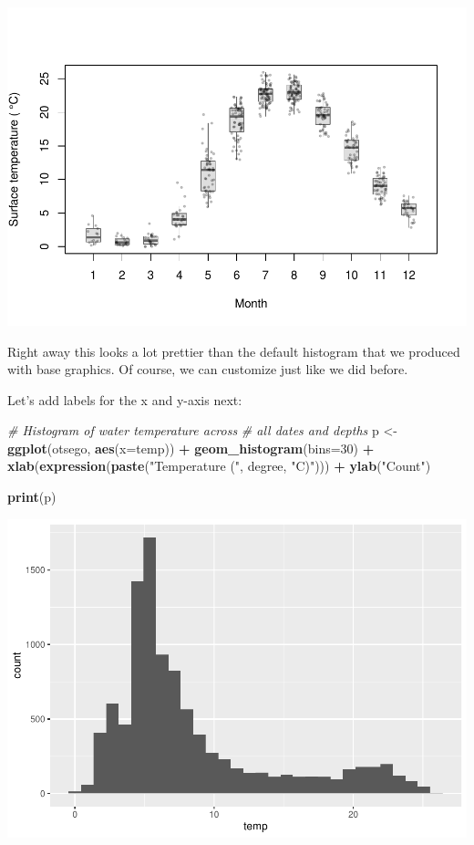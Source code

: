\documentclass[
]{book}
\newenvironment{Shaded}{\begin{snugshade}}{\end{snugshade}}
\newcommand{\CommentTok}[1]{\textcolor[rgb]{0.56,0.35,0.01}{\textit{#1}}}
\newcommand{\DataTypeTok}[1]{\textcolor[rgb]{0.13,0.29,0.53}{#1}}
\newcommand{\DecValTok}[1]{\textcolor[rgb]{0.00,0.00,0.81}{#1}}
\newcommand{\KeywordTok}[1]{\textcolor[rgb]{0.13,0.29,0.53}{\textbf{#1}}}
\newcommand{\NormalTok}[1]{#1}
\newcommand{\OperatorTok}[1]{\textcolor[rgb]{0.81,0.36,0.00}{\textbf{#1}}}
\newcommand{\StringTok}[1]{\textcolor[rgb]{0.31,0.60,0.02}{#1}}
\begin{document}
\includegraphics{worstr_files/figure-latex/unnamed-chunk-98-1.pdf}

Right away this looks a lot prettier than the default histogram that we produced with base graphics. Of course, we can customize just like we did before.

Let's add labels for the x and y-axis next:

\begin{Shaded}
\begin{Highlighting}[]
\CommentTok{# Histogram of water temperature across }
\CommentTok{# all dates and depths}
\NormalTok{p <-}\StringTok{ }\KeywordTok{ggplot}\NormalTok{(otsego, }\KeywordTok{aes}\NormalTok{(}\DataTypeTok{x=}\NormalTok{temp)) }\OperatorTok{+}\StringTok{ }
\StringTok{  }\KeywordTok{geom_histogram}\NormalTok{(}\DataTypeTok{bins=}\DecValTok{30}\NormalTok{) }\OperatorTok{+}\StringTok{ }
\StringTok{  }\KeywordTok{xlab}\NormalTok{(}\KeywordTok{expression}\NormalTok{(}\KeywordTok{paste}\NormalTok{(}\StringTok{"Temperature ("}\NormalTok{, degree, }\StringTok{"C)"}\NormalTok{))) }\OperatorTok{+}
\StringTok{  }\KeywordTok{ylab}\NormalTok{(}\StringTok{"Count"}\NormalTok{)}

\KeywordTok{print}\NormalTok{(p)}
\end{Highlighting}
\end{Shaded}

\includegraphics{worstr_files/figure-latex/unnamed-chunk-99-1.pdf}
\end{document}

